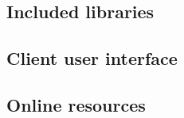 \subsection{Included libraries}
    

\subsection{Client user interface}

    
    

\subsection{Online resources}
    
